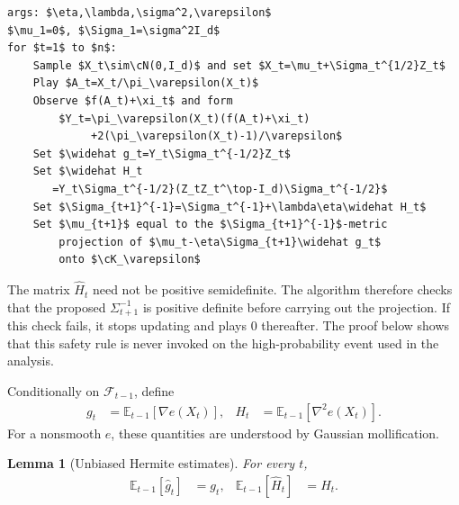 \documentclass{article}
\theoremstyle{plain}
\newtheorem{lemma}[theorem]{Lemma}
\theoremstyle{definition}
\theoremstyle{plain}
\newcommand{\E}{\mathbb E}
\newcommand{\cN}{\mathcal N}
\newcommand{\cK}{\mathcal K}
\begin{document}
\begin{algorithm}[h!]
    \begin{minipage}{13cm}
        \begin{mdframed}
            \begin{lstlisting}
args: $\eta,\lambda,\sigma^2,\varepsilon$
$\mu_1=0$, $\Sigma_1=\sigma^2I_d$
for $t=1$ to $n$:
    Sample $X_t\sim\cN(0,I_d)$ and set $X_t=\mu_t+\Sigma_t^{1/2}Z_t$
    Play $A_t=X_t/\pi_\varepsilon(X_t)$
    Observe $f(A_t)+\xi_t$ and form
        $Y_t=\pi_\varepsilon(X_t)(f(A_t)+\xi_t)
             +2(\pi_\varepsilon(X_t)-1)/\varepsilon$
    Set $\widehat g_t=Y_t\Sigma_t^{-1/2}Z_t$
    Set $\widehat H_t
       =Y_t\Sigma_t^{-1/2}(Z_tZ_t^\top-I_d)\Sigma_t^{-1/2}$
    Set $\Sigma_{t+1}^{-1}=\Sigma_t^{-1}+\lambda\eta\widehat H_t$
    Set $\mu_{t+1}$ equal to the $\Sigma_{t+1}^{-1}$-metric
        projection of $\mu_t-\eta\Sigma_{t+1}\widehat g_t$
        onto $\cK_\varepsilon$
\end{lstlisting}
            \caption{Stochastic direct Hermite--ONS.}
            \label{alg:direct-stochastic-hermite-ons}
        \end{mdframed}
    \end{minipage}
\end{algorithm}

The matrix $\widehat H_t$ need not be positive semidefinite.  The
algorithm therefore checks that the proposed $\Sigma_{t+1}^{-1}$ is
positive definite before carrying out the projection.  If this check
fails, it stops updating and plays $0$ thereafter.  The proof below
shows that this safety rule is never invoked on the high-probability
event used in the analysis.

Conditionally on $\mathcal F_{t-1}$, define
\begin{align}
    g_t & =\E_{t-1}[\nabla e(X_t)],
        &
    H_t & =\E_{t-1}[\nabla^2e(X_t)].
    \label{eq:direct-stoch-population-gH}
\end{align}
For a nonsmooth $e$, these quantities are understood by Gaussian
mollification.

\begin{lemma}[Unbiased Hermite estimates]
    \label{lem:direct-stoch-unbiased}
    For every $t$,
    \begin{align}
        \E_{t-1}[\widehat g_t] & =g_t,
                               &
        \E_{t-1}[\widehat H_t] & =H_t.
        \label{eq:direct-stoch-unbiased}
    \end{align}
\end{lemma}
\end{document}
